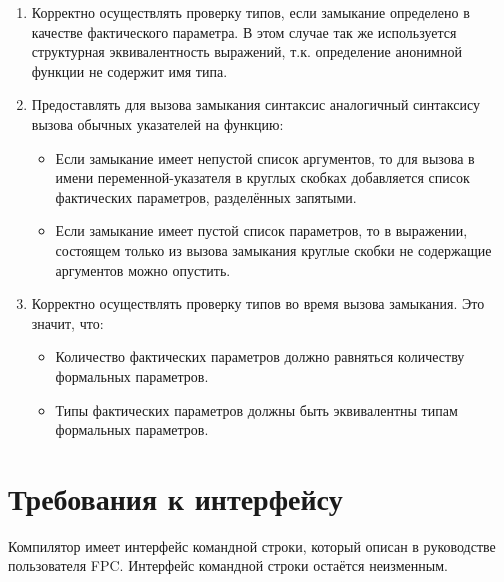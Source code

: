 \documentclass{imcs}
\begin{document}
\begin{enumerate}

        
      \item Корректно осуществлять проверку типов, если замыкание определено в качестве фактического параметра.
В этом случае так же используется структурная эквивалентность выражений, т.к. определение анонимной функции не
содержит имя типа.

        
    \item Предоставлять для вызова замыкания синтаксис аналогичный синтаксису вызова обычных указателей
 на функцию:
        \begin{itemize}
          \item Если замыкание имеет непустой список аргументов, то для вызова в имени переменной-указателя
в круглых скобках добавляется список фактических параметров, разделённых запятыми.
          \item Если замыкание имеет пустой список параметров, то в выражении, состоящем только из вызова
замыкания круглые скобки не содержащие аргументов можно опустить.

        \end{itemize}
        
  \item Корректно осуществлять проверку типов во время вызова замыкания. Это значит, что:
        \begin{itemize}
          \item Количество фактических параметров должно равняться количеству формальных параметров.
          \item Типы фактических параметров должны быть эквивалентны типам формальных параметров.
        \end{itemize}

    
\end{enumerate}


\section{Требования к интерфейсу}

Компилятор имеет интерфейс командной строки, который описан
в руководстве пользователя FPC\cite{userguide}. Интерфейс командной строки остаётся неизменным.

\end{document}
